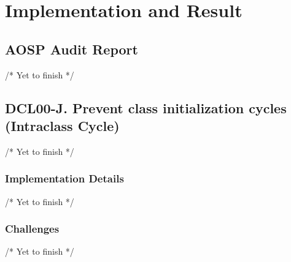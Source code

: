 \chapter{Implementation and Result}
\section{AOSP Audit Report}
/* Yet to finish */

\section{DCL00-J. Prevent class initialization cycles  (Intraclass Cycle)}
/* Yet to finish */
	\subsection{Implementation Details}
	/* Yet to finish */
    \subsection{Challenges}
  /* Yet to finish */
 
 
